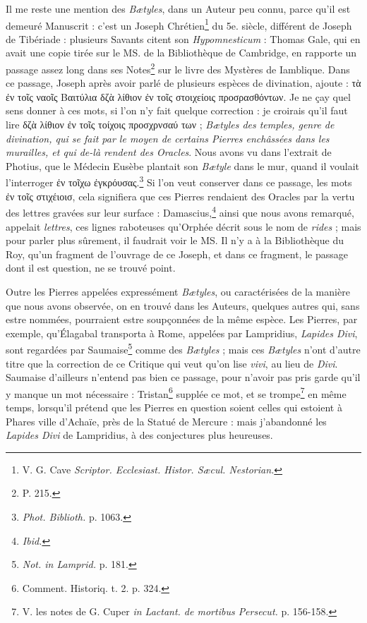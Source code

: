 \documentclass[a4paper, 11pt, oneside, polutonikogreek, french]{article}
\begin{document}
Il me reste une mention des \emph{Bætyles}, dans un Auteur peu connu, parce qu'il est demeuré Manuscrit : c'est un Joseph Chrétien\footnote{V. G. Cave \emph{Scriptor. Ecclesiast. Histor. Sæcul. Nestorian.}} du 5e. siècle, différent de Joseph de Tibériade : plusieurs Savants citent son \emph{Hypomnesticum} : Thomas Gale, qui en avait une copie tirée sur le MS. de la Bibliothèque de Cambridge, en rapporte un passage assez long dans ses Notes\footnote{P. 215.} sur le livre des Mystères de Iamblique. Dans ce passage, Joseph après avoir parlé de plusieurs espèces de divination, ajoute : τὰ ἐν τοῖς ναοῖς Βαιτύλια δζὰ λίθιον ἐν τοῖς στοιχείοις προσρασθόντων. Je ne çay quel sens donner à ces mots, si l'on n'y fait quelque correction : je croirais qu'il faut lire δζὰ λίθιον ἐν τοῖς τοίχοις προσχρνσαύ των ; \emph{Bætyles des temples, genre de divination, qui se fait par le moyen de certains Pierres enchâssées dans les murailles, et qui de-là rendent des Oracles}. Nous avons vu dans l'extrait de Photius, que le Médecin Eusèbe plantait son \emph{Bætyle} dans le mur, quand il voulait l'interroger ἐν τοῖχω ἐγκρόυσας.\footnote{\emph{Phot. Biblioth.} p. 1063.} Si l'on veut conserver dans ce passage, les mots ἐν τοῖς στιχέιοισ, cela signifiera que ces Pierres rendaient des Oracles par la vertu des lettres gravées sur leur surface : Damascius,\footnote{\emph{Ibid.}} ainsi que nous avons remarqué, appelait \emph{lettres}, ces lignes raboteuses qu'Orphée décrit sous le nom de \emph{rides} ; mais pour parler plus sûrement, il faudrait voir le MS. Il n'y a à la Bibliothèque du Roy, qu'un fragment de l'ouvrage de ce Joseph, et dans ce fragment, le passage dont il est question, ne se trouvé point.

Outre les Pierres appelées expressément \emph{Bætyles}, ou caractérisées de la manière que nous avons observée, on en trouvé dans les Auteurs, quelques autres qui, sans estre nommées, pourraient estre soupçonnées de la même espèce. Les Pierres, par exemple, qu'Élagabal transporta à Rome, appelées par Lampridius, \emph{Lapides Divi}, sont regardées par Saumaise\footnote{\emph{Not. in Lamprid.} p. 181.} comme des \emph{Bætyles} ; mais ces \emph{Bætyles} n'ont d'autre titre que la correction de ce Critique qui veut qu'on lise \emph{vivi}, au lieu de \emph{Divi}. Saumaise d'ailleurs n'entend pas bien ce passage, pour n'avoir pas pris garde qu'il y manque un mot nécessaire : Tristan\footnote{Comment. Historiq. t. 2. p. 324.} supplée ce mot, et se trompe\footnote{V. les notes de G. Cuper \emph{in Lactant. de mortibus Persecut.} p. 156-158.} en même temps, lorsqu'il prétend que les Pierres en question soient celles qui estoient à Phares ville d'Achaïe, près de la Statué de Mercure : mais j'abandonné les \emph{Lapides Divi} de Lampridius, à des conjectures plus heureuses.
\end{document}
